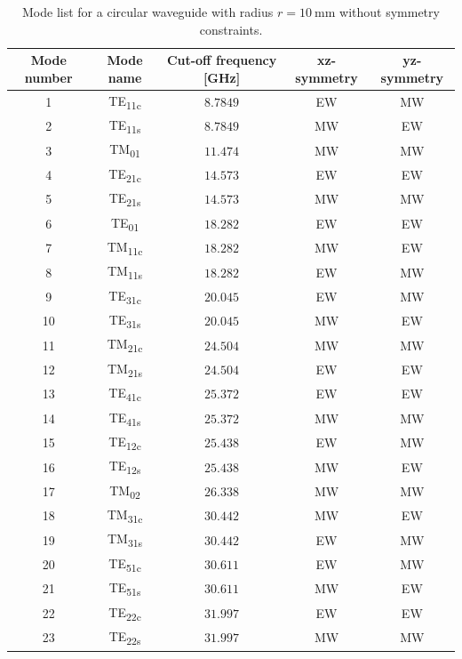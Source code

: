 \documentclass[english,twoside]{article}
\begin{document}
      \begin{table}[H]
        \centering		
        \caption{Mode list for a circular waveguide with radius $r=\SI{10}{\milli\meter}$ without symmetry constraints.}
        \begin{tabular}{c|c|c|c|c}
          Mode number & Mode name & Cut-off frequency [GHz] & xz-symmetry & yz-symmetry\\
          \hline
          1 & TE\textsubscript{11c} & $\num{8.7849}$ & EW & MW\\
          2 & TE\textsubscript{11s} & $\num{8.7849}$ & MW & EW\\
          3 & TM\textsubscript{01} & $\num{11.474}$ & MW & MW\\
          4 & TE\textsubscript{21c} & $\num{14.573}$ & EW & EW\\
          5 & TE\textsubscript{21s} & $\num{14.573}$ & MW & MW\\
          6 & TE\textsubscript{01} & $\num{18.282}$ & EW & EW\\
          7 & TM\textsubscript{11c} & $\num{18.282}$ & MW & EW\\	
          8 & TM\textsubscript{11s} & $\num{18.282}$ & EW & MW\\
          9 & TE\textsubscript{31c} & $\num{20.045}$ & EW & MW\\
          10 & TE\textsubscript{31s} & $\num{20.045}$ & MW & EW\\
          11 & TM\textsubscript{21c} & $\num{24.504}$ & MW & MW\\
          12 & TM\textsubscript{21s} & $\num{24.504}$ & EW & EW\\
          13 & TE\textsubscript{41c} & $\num{25.372}$ & EW & EW\\
          14 & TE\textsubscript{41s} & $\num{25.372}$ & MW & MW\\
          15 & TE\textsubscript{12c} & $\num{25.438}$ & EW & MW\\
          16 & TE\textsubscript{12s} & $\num{25.438}$ & MW & EW\\
          17 & TM\textsubscript{02} & $\num{26.338}$ & MW & MW\\
          18 & TM\textsubscript{31c} & $\num{30.442}$ & MW & EW\\
          19 & TM\textsubscript{31s} & $\num{30.442}$ & EW & MW\\
          20 & TE\textsubscript{51c} & $\num{30.611}$ & EW & MW\\
          21 & TE\textsubscript{51s} & $\num{30.611}$ & MW& EW\\
          22 & TE\textsubscript{22c} & $\num{31.997}$ & EW & EW\\
          23 & TE\textsubscript{22s} & $\num{31.997}$ & MW & MW		
        \end{tabular}
        \label{table:wc20}
      \end{table}
		
\end{document}
